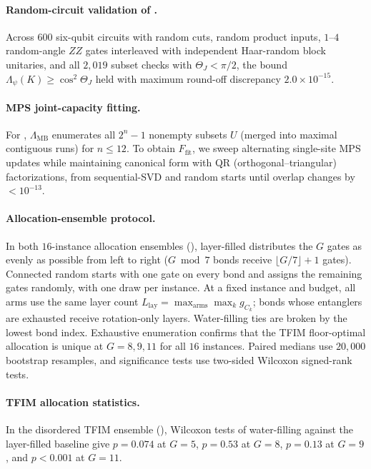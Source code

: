 \documentclass[reprint,aps,pra,floatfix,superscriptaddress,nofootinbib,longbibliography]{revtex4-2}
\theoremstyle{remark}
\theoremstyle{definition}
\begin{document}
\paragraph{Random-circuit validation of .}
Across $600$ six-qubit circuits with random cuts, random product inputs, $1$--$4$
random-angle $ZZ$ gates interleaved with independent Haar-random block unitaries,
and all $2{,}019$ subset checks with $\Theta_J<\pi/2$, the bound
$\Lambda_\psi(K)\ge\cos^2\Theta_J$ held with maximum round-off discrepancy
$2.0\times10^{-15}$.

\paragraph{MPS joint-capacity fitting.}
For , $\Lambda_{\mathrm{MB}}$ enumerates all $2^n-1$ nonempty
subsets $U$ (merged into maximal contiguous runs) for $n\le12$. To obtain $F_{\mathrm{fit}}$, we sweep alternating single-site MPS
updates while maintaining canonical form with QR (orthogonal--triangular) factorizations, from sequential-SVD and
random starts until overlap changes by $<10^{-13}$.

\paragraph{Allocation-ensemble protocol.}
In both $16$-instance allocation ensembles (), layer-filled
distributes the $G$ gates as evenly as possible from left to right ($G\bmod 7$
bonds receive $\lfloor G/7\rfloor+1$ gates). Connected random starts with one gate
on every bond and assigns the remaining gates randomly, with one draw per
instance. At a fixed instance and budget, all arms use the same layer count
$L_{\mathrm{lay}}=\max_{\mathrm{arms}}\max_k g_{C_k}$; bonds whose entanglers are
exhausted receive rotation-only layers. Water-filling ties are broken by the
lowest bond index. Exhaustive enumeration confirms that the TFIM floor-optimal
allocation is unique at $G=8,9,11$ for all $16$ instances. Paired medians use
$20{,}000$ bootstrap resamples, and significance tests use two-sided Wilcoxon
signed-rank tests.

\paragraph{TFIM allocation statistics.}
In the disordered TFIM ensemble (), Wilcoxon tests of
water-filling against the layer-filled baseline give $p=0.074$ at $G=5$,
$p=0.53$ at $G=8$, $p=0.13$ at $G=9$, and $p<0.001$ at $G=11$.
\end{document}

